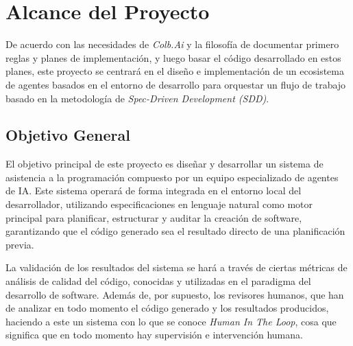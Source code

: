 \documentclass[11pt, letterpaper]{article}
\begin{document}
\newpage

\section{Alcance del Proyecto}

De acuerdo con las necesidades de \textit{Colb.Ai} y la filosofía de documentar primero reglas y planes de implementación, y luego basar el código desarrollado en estos planes, este proyecto se centrará en el diseño e implementación de un ecosistema de agentes basados en el entorno de desarrollo para orquestar un flujo de trabajo basado en la metodología de \textit{Spec-Driven Development (SDD)}.

\subsection{Objetivo General}
El objetivo principal de este proyecto es diseñar y desarrollar un sistema de asistencia a la programación compuesto por un equipo especializado de agentes de IA. Este sistema operará de forma integrada en el entorno local del desarrollador, utilizando especificaciones en lenguaje natural como motor principal para planificar, estructurar y auditar la creación de software, garantizando que el código generado sea el resultado directo de una planificación previa.

La validación de los resultados del sistema se hará a través de ciertas métricas de análisis de calidad del código, conocidas y utilizadas en el paradigma del desarrollo de software. Además de, por supuesto, los revisores humanos, que han de analizar en todo momento el código generado y los resultados producidos, haciendo a este un sistema con lo que se conoce \textit{Human In The Loop}, cosa que significa que en todo momento hay supervisión e intervención humana. \\
\end{document}
